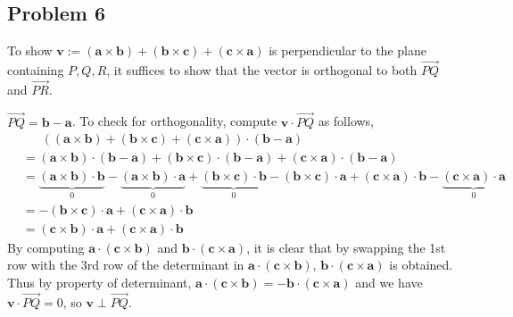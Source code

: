 \documentclass{article}
\theoremstyle{definition}
\newcommand{\vect}{\overrightarrow}
\begin{document}
\newpage
\subsection*{Problem 6}
To show $\mathbf{v} := (\mathbf{a}\times\mathbf{b}) + (\mathbf{b}\times\mathbf{c}) + (\mathbf{c}\times\mathbf{a})$ is
perpendicular to the plane containing $P, Q, R$,
it suffices to show that the vector is orthogonal to both $\vect{PQ}$ and $\vect{PR}$.

$\vect{PQ} = \mathbf{b} - \mathbf{a}$. To check for orthogonality, compute
$\mathbf{v}\cdot \vect{PQ}$
as follows,
\begin{align*}
    &\phantom{=}\ \left((\mathbf{a}\times\mathbf{b}) + (\mathbf{b}\times\mathbf{c}) + (\mathbf{c}\times\mathbf{a}) \right)
    \cdot (\mathbf{b} - \mathbf{a}) \\
    &= (\mathbf{a}\times\mathbf{b})\cdot(\mathbf{b} - \mathbf{a})
    + (\mathbf{b}\times\mathbf{c}) \cdot(\mathbf{b} - \mathbf{a})
    + (\mathbf{c}\times\mathbf{a}) \cdot(\mathbf{b} - \mathbf{a})   \\
    &= \underbrace{(\mathbf{a}\times\mathbf{b})\cdot\mathbf{b}}_{0}
    - \underbrace{(\mathbf{a}\times\mathbf{b}) \cdot\mathbf{a}}_{0}
    + \underbrace{(\mathbf{b}\times\mathbf{c}) \cdot\mathbf{b}}_{0}
    - (\mathbf{b}\times\mathbf{c}) \cdot\mathbf{a}
    + (\mathbf{c}\times\mathbf{a}) \cdot\mathbf{b}
    - \underbrace{(\mathbf{c}\times\mathbf{a}) \cdot\mathbf{a}}_{0}  \\
    &= - (\mathbf{b}\times\mathbf{c}) \cdot\mathbf{a}
    + (\mathbf{c}\times\mathbf{a}) \cdot\mathbf{b} \tag*{(matrix with duplicate rows has det $0$)} \\
    &= (\mathbf{c}\times\mathbf{b}) \cdot\mathbf{a}
    + (\mathbf{c}\times\mathbf{a}) \cdot\mathbf{b}  \tag*{(by anticommutativity of $\times$)}
\end{align*}
By computing $\mathbf{a}\cdot (\mathbf{c}\times\mathbf{b})$ and $\mathbf{b}\cdot (\mathbf{c}\times\mathbf{a})$,
it is clear that by swapping the 1st row with the 3rd row of the determinant in $\mathbf{a}\cdot (\mathbf{c}\times\mathbf{b})$,
$\mathbf{b}\cdot (\mathbf{c}\times\mathbf{a})$ is obtained.
Thus by property of determinant, $\mathbf{a}\cdot (\mathbf{c}\times\mathbf{b}) = -\mathbf{b}\cdot (\mathbf{c}\times\mathbf{a})$
and we have $\mathbf{v}\cdot \vect{PQ} = 0$, so $\mathbf{v}\perp \vect{PQ}$.
\end{document}

